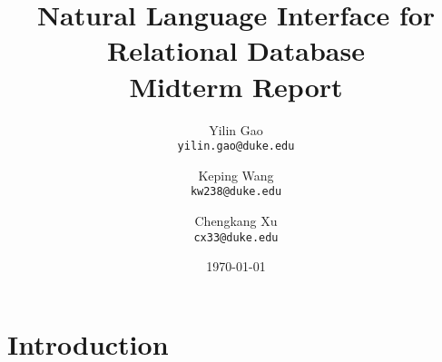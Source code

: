 \documentclass[twocolumn]{article}
\begin{document}
\title{Natural Language Interface for Relational Database\\
	\small{Midterm Report}}

\author{Yilin Gao \\
	\small \texttt{yilin.gao@duke.edu} \and 
	Keping Wang \\
	\small \texttt{kw238@duke.edu} \and 
	Chengkang Xu \\
	\small \texttt{cx33@duke.edu} }
	
\date{\today}
\maketitle

\section{Introduction}\label{sec:introduction}
\end{document}
